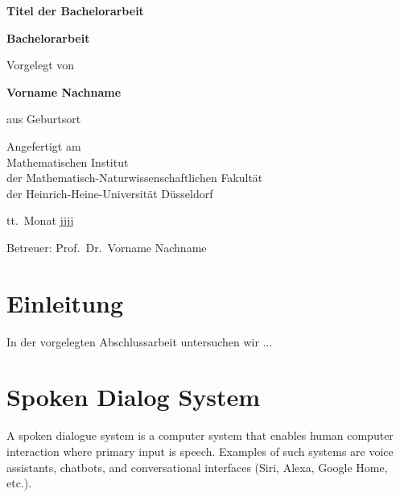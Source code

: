 \documentclass[12pt,titlepage,a4paper]{article}
\begin{document}
\begin{titlepage}
\begin{center}

\textbf{\LARGE Titel der Bachelorarbeit}

\bigskip\bigskip
\textbf{Bachelorarbeit}

\bigskip\bigskip\bigskip
Vorgelegt von

\bigskip
\textbf{Vorname Nachname}

\bigskip
aus Geburtsort


\vfill
Angefertigt am\\
Mathematischen Institut\\ 
der Mathematisch-Naturwissenschaftlichen Fakult\"at\\ 
der Heinrich-Heine-Universit\"at D\"usseldorf

\bigskip
tt.\ Monat jjjj

\bigskip
Betreuer: Prof.\ Dr.\ Vorname Nachname

\end{center}
\end{titlepage}

\thispagestyle{empty}\mbox{}\pagebreak
\setcounter{page}{0}

\tableofcontents
\pagebreak


\section*{Einleitung}

In der vorgelegten Abschlussarbeit untersuchen wir ...

\pagebreak
\section{Spoken Dialog System}
A spoken dialogue system is a computer system that enables human computer interaction where primary input is speech. Examples of such systems are voice assistants, chatbots, and conversational interfaces (Siri, Alexa, Google Home, etc.). \par
\end{document}
